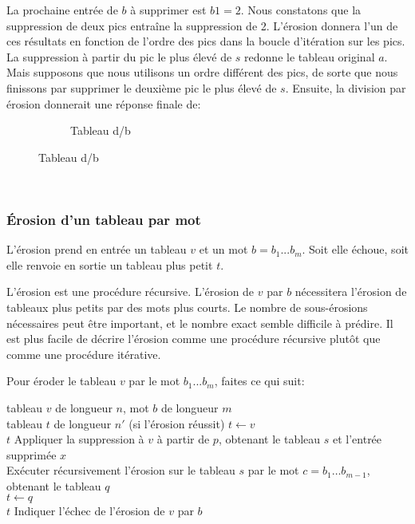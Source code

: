 La prochaine entrée de $b$ à supprimer est $b1 = 2$. 
Nous constatons que la suppression de deux pics entraîne la suppression de 2. 
L'érosion donnera l'un de ces résultats en fonction de l'ordre des pics dans la boucle d'itération sur les pics. 
La suppression à partir du pic le plus élevé de $s$ redonne le tableau original $a$. 
Mais supposons que nous utilisons un ordre différent des pics, de sorte que nous finissons par supprimer le deuxième pic le plus élevé de $s$.
Ensuite, la division par érosion donnerait une réponse finale de:
\begin{figure}[!ht]
	\centering
	\begin{subfigure}[b]{0.4\linewidth}
		\centering
		\caption{Tableau d/b}
		\label{fig:tab30}
	\end{subfigure}
	\label{fig:tabs17}
\end{figure} \\

\subsubsection{Érosion d'un tableau par mot}
L'érosion prend en entrée un tableau $v$ et un mot $b = b_1 . . . b_m$. Soit elle échoue, 
soit elle renvoie en sortie un tableau plus petit $t$.

L'érosion est une procédure récursive. L'érosion de $v$ par $b$ nécessitera l'érosion de tableaux plus petits par des mots plus courts. 
Le nombre de sous-érosions nécessaires peut être important, 
et le nombre exact semble difficile à prédire. Il est plus facile de décrire l'érosion comme une procédure récursive plutôt que comme une procédure itérative.

Pour éroder le tableau $v$ par le mot $b_1 . . . b_m$, faites ce qui suit:


\begin{algorithm}
 \caption{Erosion d'un tableau $v$ par le mot $b = b_1 \ldots b_m$}
 \Donnees 
 {tableau $v$ de longueur $n$, mot $b$ de longueur $m$ \\
 tableau $t$ de longueur $n'$ (si l'érosion réussit)}
 {
 $t \gets v$ \\
 \Retour $t$
 }
 { 
 Appliquer la suppression à $v$ à partir de $p$, obtenant le tableau $s$ et l'entrée supprimée $x$ \\
 {
 Exécuter récursivement l'érosion sur le tableau $s$ par le mot $c = b_1 \ldots b_{m-1}$, obtenant le tableau $q$ \\
 {
 $t \gets q$ \\
 \Retour $t$
 }
 }
 }
 Indiquer l'échec de l'érosion de $v$ par $b$
\end{algorithm}
 
